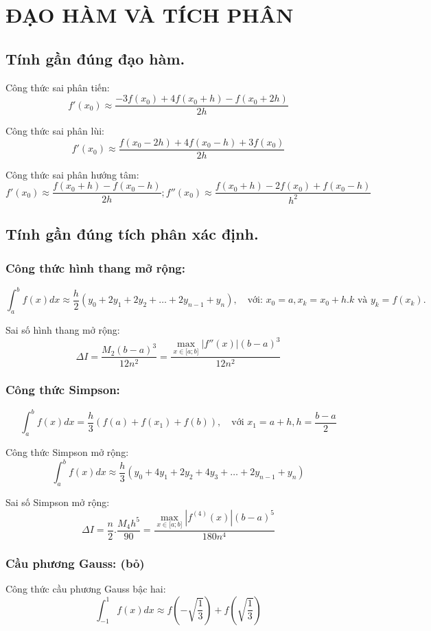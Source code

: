 \documentclass[12pt, a4paper]{report}
\begin{document}
\chapter{ĐẠO HÀM VÀ TÍCH PHÂN}
\section{Tính gần đúng đạo hàm.}
Công thức sai phân tiến: 
\[
    f'(x_0) \approx \frac{-3f(x_0) + 4f(x_0 + h) - f(x_0 + 2h)}{2h}    
\]

Công thức sai phân lùi:
\[
    f'(x_0) \approx \frac{f(x_0-2h) + 4f(x_0 - h) + 3f(x_0)}{2h}          
\]

Công thức sai phân hướng tâm:
\[
    f'(x_0) \approx \frac{f(x_0 + h) - f(x_0 - h) }{2h}; f''(x_0) \approx \frac{f(x_0 + h) -2f(x_0) + f(x_0 - h)}{h^2}    
\]
\section{Tính gần đúng tích phân xác định.}
\subsection{Công thức hình thang mở rộng:}
\[
    \int_{a}^{b} f(x) dx \approx \frac{h}{2} (y_0 + 2y_1 + 2y_2 + \ldots + 2y_{n-1} + y_n), \quad \text{với: } x_0 = a, x_k = x_0 + h.k \text{ và } y_k = f(x_k).
\]

Sai số hình thang mở rộng:
\[
    \Delta I = \frac{M_2 (b-a)^3}{12n^2} = \frac{\displaystyle\max_{x \in \lbrack a;b \rbrack} |f''(x)| (b-a)^3}{12n^2}    
\]
\subsection{Công thức Simpson:}
\[
    \int_{a}^{b} f(x) dx = \frac{h}{3}(f(a) + f(x_1) + f(b)), \quad \text{với } x_1 = a + h, h = \frac{b-a}{2}
\]

Công thức Simpson mở rộng: 
\[
    \int_{a}^{b} f(x) dx \approx \frac{h}{3}(y_0 + 4y_1 + 2y_2 + 4y_3 + \ldots + 2y_{n-1} + y_n)    
\]

Sai số Simpson mở rộng: 
\[
    \Delta I = \frac{n}{2}.\frac{M_4h^5}{90} = \frac{\displaystyle\max_{x \in \lbrack a;b \rbrack} |f^{(4)}(x)|  (b-a)^5}{180n^4}  
\]
\subsection{Cầu phương Gauss: (bỏ)}
Công thức cầu phương Gauss bậc hai:
\[
    \int_{-1}^{1} f(x) dx \approx f \left( -\sqrt{\frac{1}{3}} \right) + f \left( \sqrt{\frac{1}{3}} \right)  
\]
\end{document}
